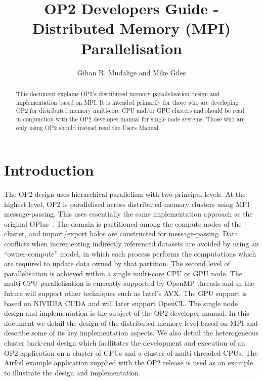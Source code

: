 \documentclass[11pt]{article}
\begin{document}
\title{OP2 Developers Guide - Distributed Memory (MPI) Parallelisation}
\author{Gihan R. Mudalige and Mike Giles}

\maketitle

\begin{abstract}
\noindent This document explains OP2's distributed memory parallelisation design and implementation based on MPI.  It is
intended primarily for those who are developing OP2 for distributed memory multi-core CPU and/or GPU clusters and should
be read in conjunction with the OP2 developer manual for single node systems. Those who are only using OP2 should
instead read the Users Manual.
\end{abstract}





\tableofcontents

\newpage

\section{Introduction}
The OP2 design uses hierarchical parallelism with two principal levels. At the highest level, OP2 is parallelised across
distributed-memory clusters using MPI message-passing.  This uses essentially the same implementation approach as the
original OPlus~\cite{oplus}.  The domain is partitioned among the compute nodes of the cluster, and import/export halos
are constructed for message-passing.  Data conflicts when  incrementing indirectly referenced datasets are avoided by
using an ``owner-compute'' model, in which each process performs the computations which are required to update data
owned by that partition.  The second level of parallelisation is achieved within a single multi-core CPU or GPU node.
The multi-CPU parallelisation is currently supported by OpenMP threads and in the future will support other techniques
such as Intel's AVX. The GPU support is based on NIVIDIA CUDA and will later support OpenCL. The single node design and
implementation is the subject of the OP2 developer manual. In this document we detail the design of the distributed
memory level based on MPI and describe some of its key implementation aspects. We also detail the heterogeneous cluster
back-end design which facilitates the development and execution of an OP2 application on a cluster of GPUs and a
cluster of multi-threaded CPUs. The Airfoil example application supplied with the OP2 release is used as an example to
illustrate the design and implementation.
\end{document}
